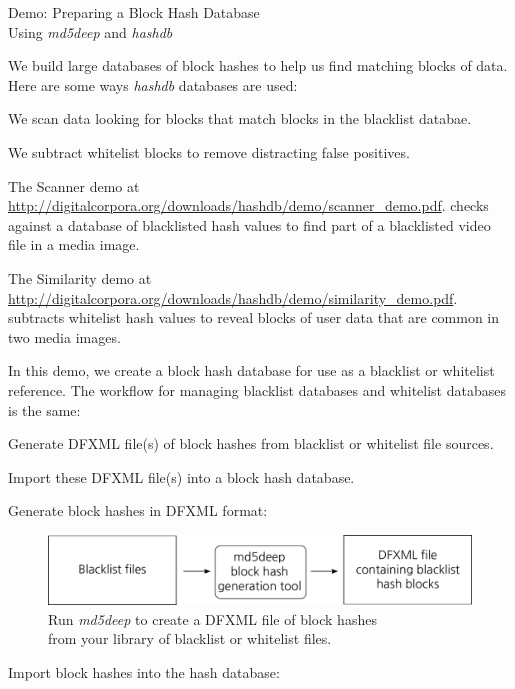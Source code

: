 \documentclass[12pt,twoside]{article}
\newcommand{\hdb}{\emph{hashdb}\xspace}
\newcommand{\mdd}{\emph{md5deep}\xspace}
\begin{document}
\begin{center}
\Large Demo: Preparing a Block Hash Database \\
\large Using \mdd and \hdb
\end{center}

We build large databases of block hashes
to help us find matching blocks of data.
Here are some ways \hdb databases are used:
\begin{compactitem}
\item We scan data looking for blocks that match blocks in the blacklist databae.
\item We subtract whitelist blocks to remove distracting false positives.
\end{compactitem}
The Scanner demo at
\url{http://digitalcorpora.org/downloads/hashdb/demo/scanner\_demo.pdf}.
checks against a database of blacklisted hash values
to find part of a blacklisted video file in a media image.

The Similarity demo at
\url{http://digitalcorpora.org/downloads/hashdb/demo/similarity\_demo.pdf}.
subtracts whitelist hash values
to reveal blocks of user data that are common in two media images.

In this demo, we create a block hash database
for use as a blacklist or whitelist reference.
The workflow for managing blacklist databases and whitelist databases
is the same:
\begin{compactenum}
\item Generate DFXML file(s) of block hashes
from blacklist or whitelist file sources.
\item Import these DFXML file(s) into a block hash database.
\end{compactenum}

Generate block hashes in DFXML format:

\begin{figure}[H]
  \center
  \includegraphics[scale=0.6]{drawings/md5deep}
  \caption*{Run \mdd to create a DFXML file of block hashes \\
            from your library of blacklist or whitelist files.}
\end{figure}

Import block hashes into the hash database:
\end{document}
